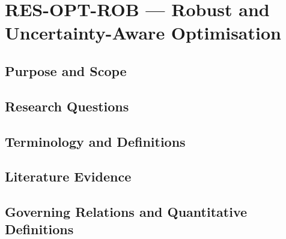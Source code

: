 
\section{RES-OPT-ROB --- Robust and Uncertainty-Aware Optimisation}
\label{sec:res-opt-rob}

\subsection{Purpose and Scope}
\label{sec:res-opt-rob-purpose}


\subsection{Research Questions}
\label{sec:res-opt-rob-research-questions}


\subsection{Terminology and Definitions}
\label{sec:res-opt-rob-definitions}


\subsection{Literature Evidence}
\label{sec:res-opt-rob-literature-evidence}

%

\subsection{Governing Relations and Quantitative Definitions}
\label{sec:res-opt-rob-governing-relations}


